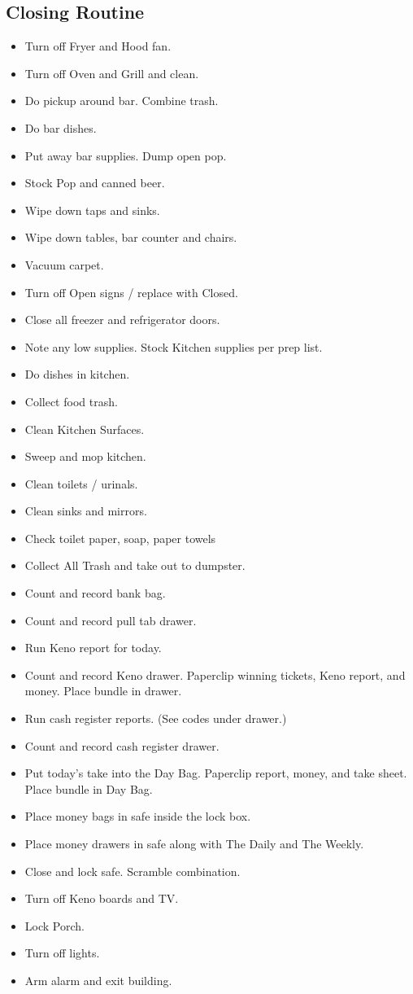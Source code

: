 \documentclass[a0,landscape]{a0poster}
\begin{document}
\begin{multicols}{4}
\subsection*{Closing Routine}
\begin{itemize}
\item Turn off Fryer and Hood fan. 
\item Turn off Oven and Grill and clean. 
\item Do pickup around bar. Combine trash. 
\item Do bar dishes. 
\item Put away bar supplies. Dump open pop. 
\item Stock Pop and canned beer. 
\item Wipe down taps and sinks. 
\item Wipe down tables, bar counter and chairs. 
\item Vacuum carpet. 
\item Turn off Open signs / replace with Closed. 
\item Close all freezer and refrigerator doors. 
\item Note any low supplies. Stock Kitchen supplies per prep list. 
\item Do dishes in kitchen. 
\item Collect food trash. 
\item Clean Kitchen Surfaces. 
\item Sweep and mop kitchen. 
\item Clean toilets / urinals. 
\item Clean sinks and mirrors. 
\item Check toilet paper, soap, paper towels 
\item Collect All Trash and take out to dumpster. 
\item Count and record bank bag. 
\item Count and record pull tab drawer. 
\item Run Keno report for today. 
\item Count and record Keno drawer. Paperclip winning tickets, Keno report, and money. Place bundle in drawer. 
\item Run cash register reports. (See codes under drawer.) 
\item Count and record cash register drawer. 
\item Put today's take into the Day Bag. Paperclip report, money, and take sheet. Place bundle in Day Bag. 
\item Place money bags in safe inside the lock box. 
\item Place money drawers in safe along with The Daily and The Weekly. 
\item Close and lock safe. Scramble combination. 
\item Turn off Keno boards and TV. 
\item Lock Porch. 
\item Turn off lights. 
\item Arm alarm and exit building. 
\end{itemize}




\end{multicols}
\end{document}
